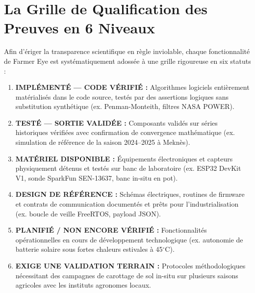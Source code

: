 \documentclass[11pt,a4paper,oneside]{report}
\begin{document}
\section{La Grille de Qualification des Preuves en 6 Niveaux}
Afin d'ériger la transparence scientifique en règle inviolable, chaque fonctionnalité de Farmer Eye est systématiquement adossée à une grille rigoureuse en six statuts :
\begin{enumerate}[leftmargin=*]
    \item \textbf{IMPLÉMENTÉ — CODE VÉRIFIÉ :} Algorithmes logiciels entièrement matérialisés dans le code source, testés par des assertions logiques sans substitution synthétique (ex. Penman-Monteith, filtres NASA POWER).
    \item \textbf{TESTÉ — SORTIE VALIDÉE :} Composants validés sur séries historiques vérifiées avec confirmation de convergence mathématique (ex. simulation de référence de la saison 2024–2025 à Meknès).
    \item \textbf{MATÉRIEL DISPONIBLE :} Équipements électroniques et capteurs physiquement détenus et testés sur banc de laboratoire (ex. ESP32 DevKit V1, sonde SparkFun SEN-13637, banc in-situ en pot).
    \item \textbf{DESIGN DE RÉFÉRENCE :} Schémas électriques, routines de firmware et contrats de communication documentés et prêts pour l'industrialisation (ex. boucle de veille FreeRTOS, payload JSON).
    \item \textbf{PLANIFIÉ / NON ENCORE VÉRIFIÉ :} Fonctionnalités opérationnelles en cours de développement technologique (ex. autonomie de batterie solaire sous fortes chaleurs estivales à 45$^\circ$C).
    \item \textbf{EXIGE UNE VALIDATION TERRAIN :} Protocoles méthodologiques nécessitant des campagnes de carottage de sol in-situ sur plusieurs saisons agricoles avec les instituts agronomes locaux.
\end{enumerate}
\end{document}
